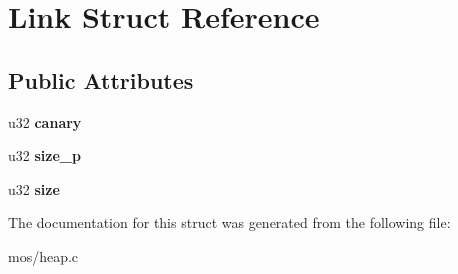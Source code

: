 \hypertarget{structLink}{}\section{Link Struct Reference}
\label{structLink}
\subsection*{Public Attributes}
\begin{DoxyCompactItemize}
\item 
\mbox{\label{structLink_a696c5493f016c6b4486c0ba00c9375fc}} 
u32 {\bfseries canary}
\item 
\mbox{\label{structLink_a36f0a757a9435573d7dc282a6287266a}} 
u32 {\bfseries size\+\_\+p}
\item 
\mbox{\label{structLink_a785d9cfe1769e87e5e0b7ce365c73975}} 
u32 {\bfseries size}
\end{DoxyCompactItemize}


The documentation for this struct was generated from the following file\+:\begin{DoxyCompactItemize}
\item 
mos/heap.\+c\end{DoxyCompactItemize}
